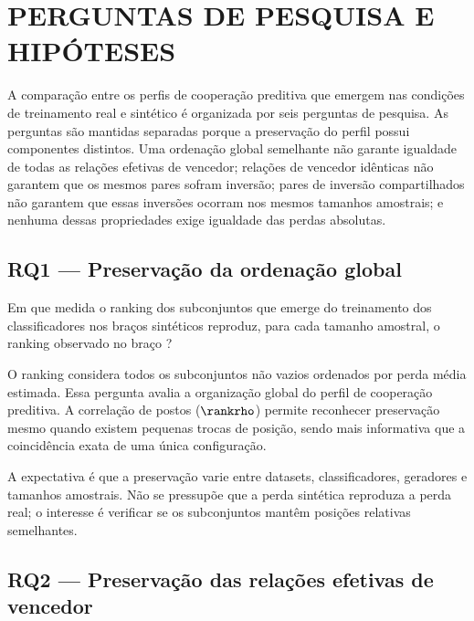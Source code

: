 
\chapter{PERGUNTAS DE PESQUISA E HIPÓTESES}

A comparação entre os perfis de cooperação preditiva que emergem nas condições de treinamento real e sintético é organizada por seis perguntas de pesquisa. As perguntas são mantidas separadas porque a preservação do perfil possui componentes distintos. Uma ordenação global semelhante não garante igualdade de todas as relações efetivas de vencedor; relações de vencedor idênticas não garantem que os mesmos pares sofram inversão; pares de inversão compartilhados não garantem que essas inversões ocorram nos mesmos tamanhos amostrais; e nenhuma dessas propriedades exige igualdade das perdas absolutas.

\section{RQ1 --- Preservação da ordenação global}

\begin{researchquestionbox}[RQ1]
Em que medida o ranking dos subconjuntos que emerge do treinamento dos classificadores nos braços sintéticos reproduz, para cada tamanho amostral, o ranking observado no braço \RealToReal{}?
\end{researchquestionbox}

O ranking considera todos os subconjuntos não vazios ordenados por perda média estimada. Essa pergunta avalia a organização global do perfil de cooperação preditiva. A correlação de postos ($\rankrho$) permite reconhecer preservação mesmo quando existem pequenas trocas de posição, sendo mais informativa que a coincidência exata de uma única configuração.

A expectativa é que a preservação varie entre datasets, classificadores, geradores e tamanhos amostrais. Não se pressupõe que a perda sintética reproduza a perda real; o interesse é verificar se os subconjuntos mantêm posições relativas semelhantes.

\section{RQ2 --- Preservação das relações efetivas de vencedor}

